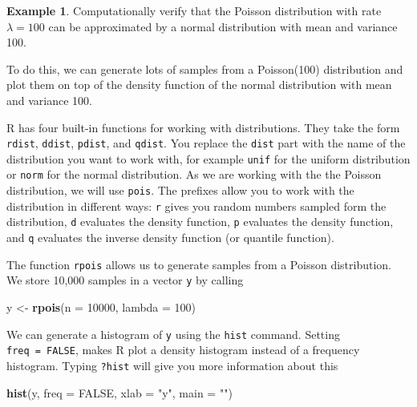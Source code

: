 \documentclass[
]{book}
\newenvironment{Shaded}{\begin{snugshade}}{\end{snugshade}}
\newcommand{\AttributeTok}[1]{\textcolor[rgb]{0.13,0.29,0.53}{#1}}
\newcommand{\ConstantTok}[1]{\textcolor[rgb]{0.56,0.35,0.01}{#1}}
\newcommand{\DecValTok}[1]{\textcolor[rgb]{0.00,0.00,0.81}{#1}}
\newcommand{\FunctionTok}[1]{\textcolor[rgb]{0.13,0.29,0.53}{\textbf{#1}}}
\newcommand{\NormalTok}[1]{#1}
\newcommand{\OtherTok}[1]{\textcolor[rgb]{0.56,0.35,0.01}{#1}}
\newcommand{\StringTok}[1]{\textcolor[rgb]{0.31,0.60,0.02}{#1}}
\theoremstyle{definition}
\theoremstyle{definition}
\newtheorem{example}{Example}[chapter]
\theoremstyle{definition}
\theoremstyle{definition}
\theoremstyle{remark}
\begin{document}
\begin{example}
Computationally verify that the Poisson distribution with rate \(\lambda = 100\) can be approximated by a normal distribution with mean and variance 100.

To do this, we can generate lots of samples from a Poisson(100) distribution and plot them on top of the density function of the normal distribution with mean and variance 100.

R has four built-in functions for working with distributions. They take the form \texttt{rdist}, \texttt{ddist}, \texttt{pdist}, and \texttt{qdist}. You replace the \texttt{dist} part with the name of the distribution you want to work with, for example \texttt{unif} for the uniform distribution or \texttt{norm} for the normal distribution. As we are working with the the Poisson distribution, we will use \texttt{pois}. The prefixes allow you to work with the distribution in different ways: \texttt{r} gives you random numbers sampled form the distribution, \texttt{d} evaluates the density function, \texttt{p} evaluates the density function, and \texttt{q} evaluates the inverse density function (or quantile function).

The function \texttt{rpois} allows us to generate samples from a Poisson distribution. We store 10,000 samples in a vector \texttt{y} by calling

\begin{Shaded}
\begin{Highlighting}[]
\NormalTok{y }\OtherTok{\textless{}{-}} \FunctionTok{rpois}\NormalTok{(}\AttributeTok{n =} \DecValTok{10000}\NormalTok{, }\AttributeTok{lambda =} \DecValTok{100}\NormalTok{)}
\end{Highlighting}
\end{Shaded}

We can generate a histogram of \texttt{y} using the \texttt{hist} command. Setting \texttt{freq\ =\ FALSE}, makes R plot a density histogram instead of a frequency histogram. Typing \texttt{?hist} will give you more information about this

\begin{Shaded}
\begin{Highlighting}[]
\FunctionTok{hist}\NormalTok{(y, }\AttributeTok{freq =} \ConstantTok{FALSE}\NormalTok{, }\AttributeTok{xlab =} \StringTok{"y"}\NormalTok{, }\AttributeTok{main =} \StringTok{""}\NormalTok{)}
\end{Highlighting}
\end{Shaded}


\end{example}
\end{document}
